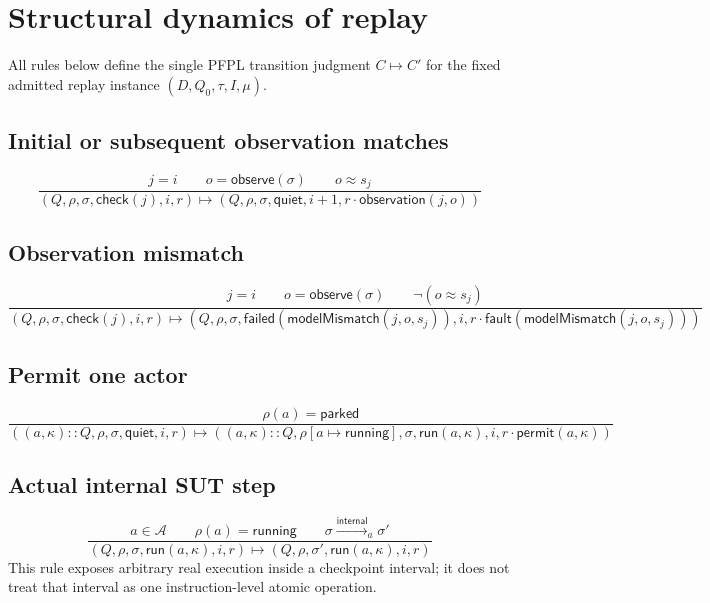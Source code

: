 \documentclass{article}
\newcommand{\Parked}{\mathsf{parked}}
\newcommand{\Running}{\mathsf{running}}
\newcommand{\Quiet}{\mathsf{quiet}}
\newcommand{\Run}{\mathsf{run}}
\newcommand{\CheckPhase}{\mathsf{check}}
\newcommand{\Failed}{\mathsf{failed}}
\newcommand{\Internal}{\mathsf{internal}}
\newcommand{\observe}{\mathsf{observe}}
\newcommand{\matches}{\approx}
\begin{document}
\section{Structural dynamics of replay}

All rules below define the single PFPL transition judgment $C\longmapsto C'$
for the fixed admitted replay instance $(D,Q_0,\tau,I,\mu)$.

\subsection*{Initial or subsequent observation matches}
\[
\frac{
  j=i\qquad o=\observe(\sigma)\qquad o\matches s_j
}{
  (Q,\rho,\sigma,\CheckPhase(j),i,r)
  \longmapsto
  (Q,\rho,\sigma,\Quiet,i+1,r\cdot\mathsf{observation}(j,o))
}
\]

\subsection*{Observation mismatch}
\[
\frac{
  j=i\qquad o=\observe(\sigma)\qquad \neg(o\matches s_j)
}{
  (Q,\rho,\sigma,\CheckPhase(j),i,r)
  \longmapsto
  (Q,\rho,\sigma,\Failed(\mathsf{modelMismatch}(j,o,s_j)),i,
    r\cdot\mathsf{fault}(\mathsf{modelMismatch}(j,o,s_j)))
}
\]

\subsection*{Permit one actor}
\[
\frac{
  \rho(a)=\Parked
}{
  ((a,\kappa)::Q,\rho,\sigma,\Quiet,i,r)
  \longmapsto
  ((a,\kappa)::Q,\rho[a\mapsto\Running],\sigma,\Run(a,\kappa),i,
    r\cdot\mathsf{permit}(a,\kappa))
}
\]

\subsection*{Actual internal SUT step}
\[
\frac{
  a\in\mathcal A\qquad \rho(a)=\Running\qquad
  \sigma\xrightarrow{\Internal}_{a}\sigma'
}{
  (Q,\rho,\sigma,\Run(a,\kappa),i,r)
  \longmapsto
  (Q,\rho,\sigma',\Run(a,\kappa),i,r)
}
\]
This rule exposes arbitrary real execution inside a checkpoint interval; it
does not treat that interval as one instruction-level atomic operation.
\end{document}
